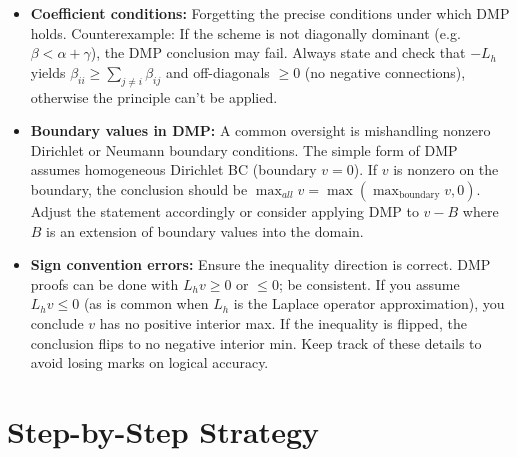 \documentclass[a4paper,11pt]{report}
\begin{document}
\begin{pitfalls}{}{}
    \begin{itemize}
        \item \textbf{Coefficient conditions:} Forgetting the precise conditions under which DMP holds. Counterexample: If the scheme is not diagonally dominant (e.g. $\beta < \alpha+\gamma$), the DMP conclusion may fail. Always state and check that $-L_h$ yields $\beta_{ii}\ge \sum_{j\neq i}\beta_{ij}$ and off-diagonals $\ge0$ (no negative connections), otherwise the principle can't be applied.
        \item \textbf{Boundary values in DMP:} A common oversight is mishandling nonzero Dirichlet or Neumann boundary conditions. The simple form of DMP assumes homogeneous Dirichlet BC (boundary $v=0$). If $v$ is nonzero on the boundary, the conclusion should be $\max_{all} v = \max(\max_{\text{boundary}}v, 0)$. Adjust the statement accordingly or consider applying DMP to $v - B$ where $B$ is an extension of boundary values into the domain.
        \item \textbf{Sign convention errors:} Ensure the inequality direction is correct. DMP proofs can be done with $L_h v \ge 0$ or $\le0$; be consistent. If you assume $L_h v \le 0$ (as is common when $L_h$ is the Laplace operator approximation), you conclude $v$ has no positive interior max. If the inequality is flipped, the conclusion flips to no negative interior min. Keep track of these details to avoid losing marks on logical accuracy.
    \end{itemize}
\end{pitfalls}
\clearpage

\section{Step-by-Step Strategy}
\end{document}
